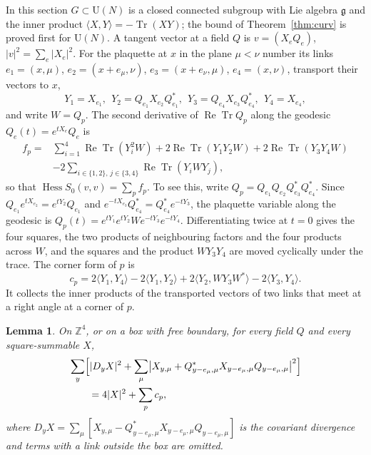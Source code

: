 \documentclass[aps,prd,twocolumn,superscriptaddress,nofootinbib,longbibliography,floatfix,amsmath,amssymb,10pt]{revtex4-2}
\newtheorem{lemma}[theorem]{Lemma}
\theoremstyle{definition}
\theoremstyle{remark}
\newcommand{\Z}{\mathbb{Z}}
\newcommand{\U}{\mathrm{U}}
\newcommand{\g}{\mathfrak{g}}
\newcommand{\Tr}{\operatorname{Tr}}
\newcommand{\ReTr}{\operatorname{Re}\operatorname{Tr}}
\newcommand{\Hess}{\operatorname{Hess}}
\newcommand{\ip}[2]{\langle #1,#2\rangle}
\begin{document}
In this section $G\subset\U(N)$ is a closed connected subgroup with Lie
algebra $\g$ and the inner product $\ip XY=-\Tr(XY)$; the bound of
Theorem~\ref{thm:curv} is proved first for $\U(N)$. A tangent vector at a field $Q$ is $v=(X_eQ_e)$,
$|v|^2=\sum_e|X_e|^2$. For the plaquette at $x$ in the plane $\mu<\nu$ number
its links $e_1=(x,\mu)$, $e_2=(x+e_\mu,\nu)$, $e_3=(x+e_\nu,\mu)$,
$e_4=(x,\nu)$, transport their vectors to $x$,
\begin{equation}\label{eq:transport}
Y_1=X_{e_1},\ \ Y_2=Q_{e_1}X_{e_2}Q_{e_1}^*,\ \
Y_3=Q_{e_4}X_{e_3}Q_{e_4}^*,\ \ Y_4=X_{e_4},
\end{equation}
and write $W=Q_p$. The second derivative of $\ReTr Q_p$ along the geodesic
$Q_e(t)=e^{tX_e}Q_e$ is
\begin{equation}\label{eq:fp}
\begin{split}
f_p={}&\sum_{i=1}^4\ReTr(Y_i^2W)+2\ReTr(Y_1Y_2W)+2\ReTr(Y_3Y_4W)\\
&-2\sum_{i\in\{1,2\},\,j\in\{3,4\}}\ReTr(Y_iWY_j),
\end{split}
\end{equation}
so that $\Hess S_0(v,v)=\sum_pf_p$. To see this, write $Q_p=Q_{e_1}Q_{e_2}Q_{e_3}^*Q_{e_4}^*$. Since
$Q_{e_1}e^{tX_{e_2}}=e^{tY_2}Q_{e_1}$ and $e^{-tX_{e_3}}Q_{e_4}^*=Q_{e_4}^*
e^{-tY_3}$, the plaquette variable along the geodesic is
$Q_p(t)=e^{tY_1}e^{tY_2}We^{-tY_3}e^{-tY_4}$. Differentiating twice at $t=0$
gives the four squares, the two products of neighbouring factors and the four
products across $W$, and the squares and the product $WY_3Y_4$ are moved
cyclically under the trace. The corner form of $p$ is
\begin{equation}\label{eq:corner}
c_p=2\ip{Y_1}{Y_4}-2\ip{Y_1}{Y_2}+2\ip{Y_2}{WY_3W^*}-2\ip{Y_3}{Y_4}.
\end{equation}
It collects the inner products of the transported vectors of two links that
meet at a right angle at a corner of $p$.

\begin{lemma}\label{lem:identity}
On $\Z^4$, or on a box with free boundary, for every field $Q$ and every
square-summable $X$,
\[
\begin{split}
&\sum_y\Bigl[|D_yX|^2+\sum_\mu\bigl|X_{y,\mu}+Q^*_{y-e_\mu,\mu}X_{y-e_\mu,\mu}
Q_{y-e_\mu,\mu}\bigr|^2\Bigr]\\
&\qquad=4|X|^2+\sum_pc_p ,
\end{split}
\]
where $D_yX=\sum_\mu[X_{y,\mu}-Q^*_{y-e_\mu,\mu}X_{y-e_\mu,\mu}Q_{y-e_\mu,\mu}]$ is
the covariant divergence and terms with a link outside the box are omitted.
\end{lemma}
\end{document}
